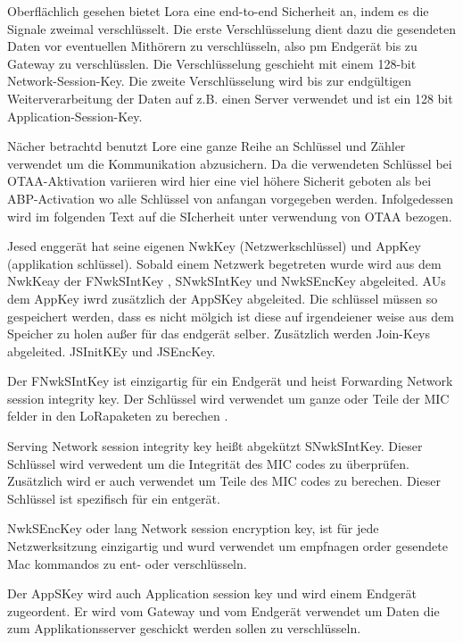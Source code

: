 \documentclass[a4paper,12pt]{article}
\begin{document}
        Oberflächlich gesehen bietet Lora eine end-to-end Sicherheit an, indem es die Signale zweimal verschlüsselt.
        Die erste Verschlüsselung dient dazu die gesendeten Daten vor eventuellen Mithörern zu verschlüsseln, also pm Endgerät bis zu Gateway zu verschlüsslen. Die Verschlüsselung geschieht mit einem 128-bit Network-Session-Key.
        Die zweite Verschlüsselung wird bis zur endgültigen Weiterverarbeitung der Daten auf z.B. einen Server verwendet und ist ein 128 bit Application-Session-Key.

        Nächer betrachtd benutzt Lore eine ganze Reihe an Schlüssel und Zähler verwendet um die Kommunikation abzusichern. Da die verwendeten Schlüssel bei OTAA-Aktivation variieren wird hier eine viel höhere Sicherit geboten als bei ABP-Activation wo alle Schlüssel von anfangan vorgegeben werden.
        Infolgedessen wird im folgenden Text auf die SIcherheit unter verwendung von OTAA bezogen.

        Jesed enggerät hat seine eigenen NwkKey (Netzwerkschlüssel) und AppKey (applikation schlüssel). Sobald einem Netzwerk begetreten wurde wird aus dem NwkKeay der FNwkSIntKey , SNwkSIntKey und NwkSEncKey
        abgeleited. AUs dem AppKey iwrd zusätzlich der AppSKey abgeleited. Die schlüssel müssen so gespeichert werden, dass es nicht mölgich ist diese auf irgendeiener weise aus dem Speicher zu holen außer für das endgerät selber.
        Zusätzlich werden Join-Keys abgeleited. JSInitKEy und JSEncKey.

        Der FNwkSIntKey ist einzigartig für ein Endgerät und heist Forwarding Network session integrity key. Der Schlüssel wird verwendet um ganze oder Teile der MIC felder in den LoRapaketen zu berechen . 
        
        Serving Network session integrity key heißt abgekützt SNwkSIntKey. Dieser Schlüssel wird
        verwedent um die Integrität des MIC codes zu überprüfen. Zusätzlich wird er auch verwendet um Teile des MIC codes zu berechen. Dieser Schlüssel ist spezifisch für ein entgerät.
        
        NwkSEncKey oder lang Network session encryption key, ist für jede Netzwerksitzung einzigartig und wurd verwendet um empfnagen order gesendete
        Mac kommandos zu ent- oder verschlüsseln.
        
        Der AppSKey wird auch Application session key und wird einem Endgerät zugeordent. Er wird vom Gateway und vom Endgerät verwendet um  Daten die zum Applikationsserver geschickt werden sollen zu verschlüsseln.
       
\end{document}
